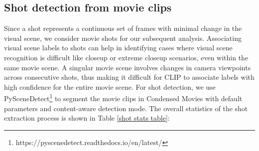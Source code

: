 \subsection{Shot detection from movie clips}
Since a shot represents a continuous set of frames with minimal change in the visual scene, we consider movie shots for our subsequent analysis. Associating visual scene labels to shots can help in identifying cases where visual scene recognition is difficult like closeup or extreme closeup scenarios, even within the same movie scene. A singular movie scene involves changes in camera viewpoints across consecutive shots, thus making it difficult for CLIP to associate labels with high confidence for the entire movie scene.
For shot detection, we use PySceneDetect\footnote{https://pyscenedetect.readthedocs.io/en/latest/} to segment the movie clips in Condensed Movies with default parameters and content-aware detection mode. The overall statistics of the shot extraction process is shown in Table \ref{shot stats table}:

\begin{table}[h!]
\centering 
{}
\vspace{1mm}
\caption{Statistics of movie shots in MovieCLIP dataset.}
\label{shot stats table}
\end{table}

